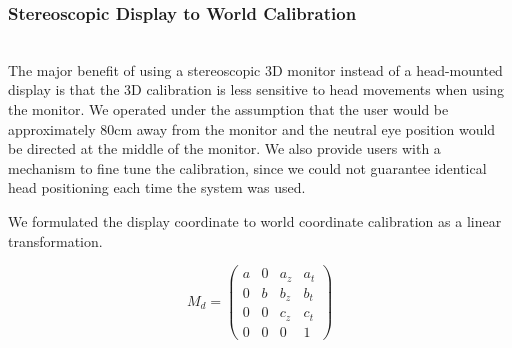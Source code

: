\documentclass[pageno]{jpaper}
\begin{document}
\subsubsection{Stereoscopic Display to World Calibration}$ $\\
The major benefit of using a stereoscopic 3D monitor instead of a head-mounted display is that the 3D calibration is less sensitive to
head movements when using the monitor. We operated under the assumption that the user would be approximately 80cm away from the monitor
and the neutral eye position would be directed at the middle of the monitor. We also provide users with a mechanism to fine tune the
calibration, since we could not guarantee identical head positioning each time the system was used.

We formulated the display coordinate to world coordinate calibration as a linear transformation.

$$M_{d} = \left(
\begin{array}{cccc}
a & 0 & a_z & a_t \\
0 & b & b_z & b_t \\
0 & 0 & c_z & c_t \\
0 & 0 &   0 &   1
\end{array}\right)$$
\end{document}

